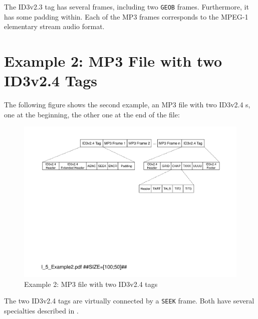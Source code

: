 The ID3v2.3 tag has several frames, including two \texttt{GEOB} frames. Furthermore, it has some padding within. Each of the MP3 frames corresponds to the MPEG-1 elementary stream audio format.


\section{Example 2: MP3 File with two ID3v2.4 Tags}
\label{sec:Example2MP3FileWithID3v23AndID3v11}

The following figure shows the second example, an MP3 file with two ID3v2.4 \TERMtag{}s, one at the beginning, the other one at the end of the file:

\begin{figure}[H]
	\centering
	\includegraphics[width=1.00\textwidth]{Figures/Part_I/I_5_Example2.pdf}
	\caption{Example 2: MP3 file with two ID3v2.4 tags}
	\label{fig:Example1MP3filewithtwoID3tags}
\end{figure}

The two ID3v2.4 tags are virtually connected by a \texttt{SEEK} frame. Both have several specialties described in \cite{MetadataCompendium}.


